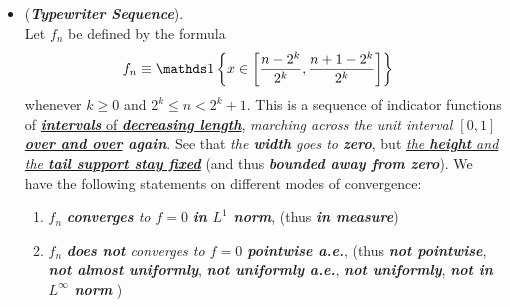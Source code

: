 \documentclass[11pt]{article}
\begin{document}
\begin{itemize}
\item \begin{example}  (\emph{\textbf{Typewriter Sequence}}). \\
Let $f_n$ be defined by the formula
\begin{align*}
f_{n} &\equiv \ind{x \in \brac{ \frac{n- 2^{k}}{2^{k}} , \frac{n+ 1- 2^{k}}{2^{k}}}}
\end{align*} whenever $k \ge  0$ and $2^k \le  n < 2^{k}+1$. This is a sequence of indicator functions of \underline{\emph{\textbf{intervals}} of \emph{\textbf{decreasing length}}}, \emph{marching across the unit interval $[0, 1]$ \textbf{\underline{over and over} again}}. See that \emph{the \textbf{width} goes to \textbf{zero}}, but \underline{\emph{the \textbf{height} and the \textbf{tail support stay fixed}}} (and thus \emph{\textbf{bounded away from zero}}). We have the following statements on different modes of convergence:
\begin{enumerate}
\item $f_n$ \emph{\textbf{converges} to $f = 0$} \emph{\textbf{in $L^1$ norm}}, (thus \emph{\textbf{in measure}}) 
\item  $f_n$ \emph{\textbf{does not} converges  to $f = 0$ \textbf{pointwise a.e.}}, (thus \emph{\textbf{not pointwise}}, \emph{\textbf{not almost uniformly}}, \emph{\textbf{not uniformly a.e.}},  \emph{\textbf{not uniformly}}, \emph{\textbf{not in $L^{\infty}$ norm}} ) 
\end{enumerate}
\end{example}
\end{itemize}
\end{document}
